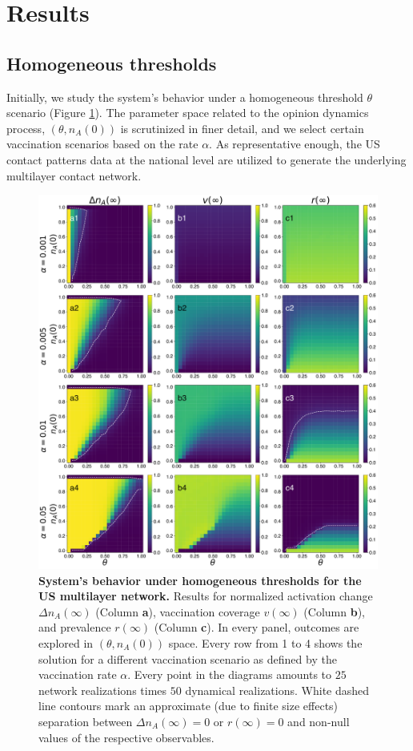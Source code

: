 \documentclass[
 reprint,
 amsmath,amssymb,
 aps,
]{revtex4-2}
\begin{document}
\section{Results}
\label{sec:results}

\subsection{Homogeneous thresholds}
\label{subsec:homogeneous}

Initially, we study the system's behavior under a homogeneous threshold $\theta$ scenario (Figure \ref{fig:main_homogeneous_heatmap}). The parameter space related to the opinion dynamics process, $(\theta, n_A(0))$ is scrutinized in finer detail, and we select certain vaccination scenarios based on the rate $\alpha$. As representative enough, the US contact patterns data at the national level are utilized to generate the underlying multilayer contact network.

\begin{figure}
\centering
\includegraphics[width=\textwidth]{figure2.pdf}
\caption[Homogeneous thresholds for the US multilayer network]{\label{fig:main_homogeneous_heatmap} \textbf{System's behavior under homogeneous thresholds for the US multilayer network.}  Results for normalized activation change $\Delta n_A(\infty)$ (Column \textbf{a}), vaccination coverage $v(\infty)$ (Column \textbf{b}), and prevalence $r(\infty)$ (Column \textbf{c}). In every panel, outcomes are explored in $(\theta,n_A(0))$ space. Every row from 1 to 4 shows the solution for a different vaccination scenario as defined by the vaccination rate $\alpha$. Every point in the diagrams amounts to $25$ network realizations times $50$ dynamical realizations. White dashed line contours mark an approximate (due to finite size effects) separation between $\Delta n_A(\infty)=0$ or $r(\infty)=0$ and non-null values of the respective observables.}
\end{figure}
\end{document}
